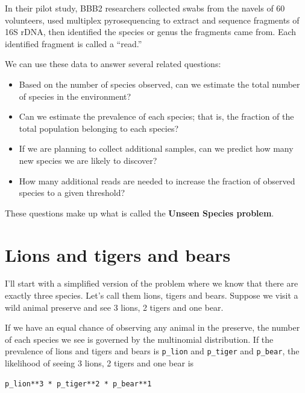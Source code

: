 \documentclass[12pt]{book}
\begin{document}
In their pilot study, BBB2 researchers collected swabs from the navels
of 60 volunteers, used multiplex pyrosequencing to extract and sequence
fragments of 16S rDNA, then identified the species or genus the
fragments came from.  Each identified fragment is called a ``read.''

We can use these data to answer several related questions:

\begin{itemize}

\item Based on the number of species observed, can we estimate
  the total number of species in the environment?

\item Can we estimate the prevalence of each species; that is, the
  fraction of the total population belonging to each species?

\item If we are planning to collect additional samples, can we predict
  how many new species we are likely to discover?

\item How many additional reads are needed to increase the
  fraction of observed species to a given threshold?

\end{itemize}

These questions make up what is called the {\bf Unseen Species problem}.


\section{Lions and tigers and bears}

I'll start with a simplified version of the problem where we know that
there are exactly three species.  Let's call them lions, tigers and
bears.  Suppose we visit a wild animal preserve and see 3 lions, 2
tigers and one bear.

If we have an equal chance of observing any animal in the preserve,
the number of each species we see is governed by the multinomial
distribution.  If the prevalence of lions and tigers and bears is
\verb"p_lion" and \verb"p_tiger" and \verb"p_bear", the likelihood of
seeing 3 lions, 2 tigers and one bear is

\begin{verbatim}
p_lion**3 * p_tiger**2 * p_bear**1
\end{verbatim}
\end{document}
